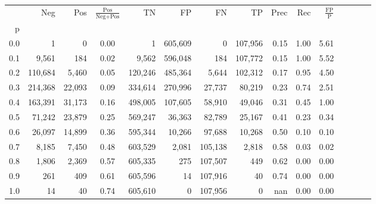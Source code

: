 \begin{tabular}{rrrcrrrrrrrrrrr}
\toprule
{} &      Neg &     Pos & $\frac{\text{Pos}}{\text{Neg}+\text{Pos}}$ &       TN &       FP &       FN &       TP &  Prec &   Rec & $\frac{\text{FP}}{\text{P}}$ \\
p   &          &         &                                            &          &          &          &          &       &       &                              \\
\midrule
0.0 &        1 &       0 &                                       0.00 &        1 &  605,609 &        0 &  107,956 &  0.15 &  1.00 &                         5.61 \\
0.1 &    9,561 &     184 &                                       0.02 &    9,562 &  596,048 &      184 &  107,772 &  0.15 &  1.00 &                         5.52 \\
0.2 &  110,684 &   5,460 &                                       0.05 &  120,246 &  485,364 &    5,644 &  102,312 &  0.17 &  0.95 &                         4.50 \\
0.3 &  214,368 &  22,093 &                                       0.09 &  334,614 &  270,996 &   27,737 &   80,219 &  0.23 &  0.74 &                         2.51 \\
0.4 &  163,391 &  31,173 &                                       0.16 &  498,005 &  107,605 &   58,910 &   49,046 &  0.31 &  0.45 &                         1.00 \\
0.5 &   71,242 &  23,879 &                                       0.25 &  569,247 &   36,363 &   82,789 &   25,167 &  0.41 &  0.23 &                         0.34 \\
0.6 &   26,097 &  14,899 &                                       0.36 &  595,344 &   10,266 &   97,688 &   10,268 &  0.50 &  0.10 &                         0.10 \\
0.7 &    8,185 &   7,450 &                                       0.48 &  603,529 &    2,081 &  105,138 &    2,818 &  0.58 &  0.03 &                         0.02 \\
0.8 &    1,806 &   2,369 &                                       0.57 &  605,335 &      275 &  107,507 &      449 &  0.62 &  0.00 &                         0.00 \\
0.9 &      261 &     409 &                                       0.61 &  605,596 &       14 &  107,916 &       40 &  0.74 &  0.00 &                         0.00 \\
1.0 &       14 &      40 &                                       0.74 &  605,610 &        0 &  107,956 &        0 &   nan &  0.00 &                         0.00 \\
\bottomrule
\end{tabular}
